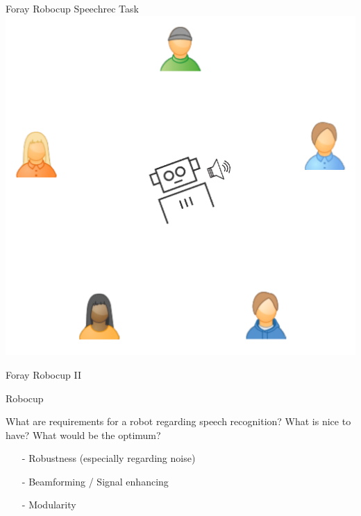 \documentclass{beamer}
\begin{document}
	\begin{frame}{Foray Robocup Speechrec Task}
		\centering
		\includegraphics[width=.75\textwidth]{Bilder/robocup_task_2}
	\end{frame}
	
	\begin{frame}{Foray Robocup II}
		\centering
	\end{frame}
	
	\begin{frame}{Robocup}
		
		\begin{alertblock}{What are requirements for a robot regarding speech recognition? What is nice to have? What would be the optimum?}
			\pause
			\begin{itemize}
				\item[-] Robustness (especially regarding noise)
				\item[-] Beamforming / Signal enhancing
				\item[-] Modularity
			\end{itemize}
		\end{alertblock}
		
	\end{frame}
	
\end{document}
